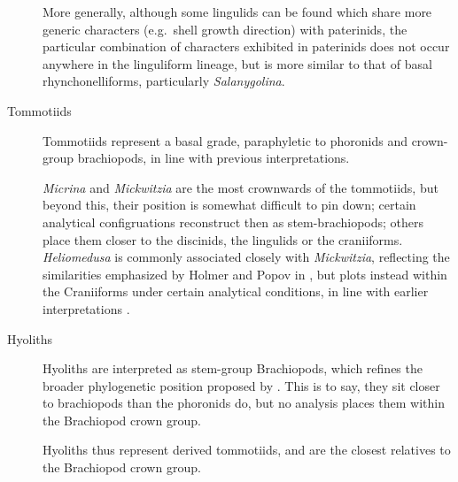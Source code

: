 \documentclass[openany]{book}
\theoremstyle{definition}
\theoremstyle{definition}
\theoremstyle{definition}
\theoremstyle{remark}
\begin{document}
\begin{description}
More generally, although some lingulids can be found which share more
generic characters (e.g.~shell growth direction) with paterinids, the
particular combination of characters exhibited in paterinids does not
occur anywhere in the linguliform lineage, but is more similar to that
of basal rhynchonelliforms, particularly \emph{Salanygolina}.
\item[Tommotiids]
Tommotiids represent a basal grade, paraphyletic to phoronids and
crown-group brachiopods, in line with previous interpretations.

\emph{Micrina} and \emph{Mickwitzia} are the most crownwards of the
tommotiids, but beyond this, their position is somewhat difficult to pin
down; certain analytical configruations reconstruct then as
stem-brachiopods; others place them closer to the discinids, the
lingulids or the craniiforms. \emph{Heliomedusa} is commonly associated
closely with \emph{Mickwitzia}, reflecting the similarities emphasized
by Holmer and Popov in \citet{Williams2007Supplement}, but plots instead
within the Craniiforms under certain analytical conditions, in line with
earlier interpretations \citep{Williams2000LinguliformeaCraniiformea}.
\item[Hyoliths]
Hyoliths are interpreted as stem-group Brachiopods, which refines the
broader phylogenetic position proposed by
\citet{Moysiuk2017Hyolithsare}. This is to say, they sit closer to
brachiopods than the phoronids do, but no analysis places them within
the Brachiopod crown group.

Hyoliths thus represent derived tommotiids, and are the closest
relatives to the Brachiopod crown group.
\end{description}


\end{document}
